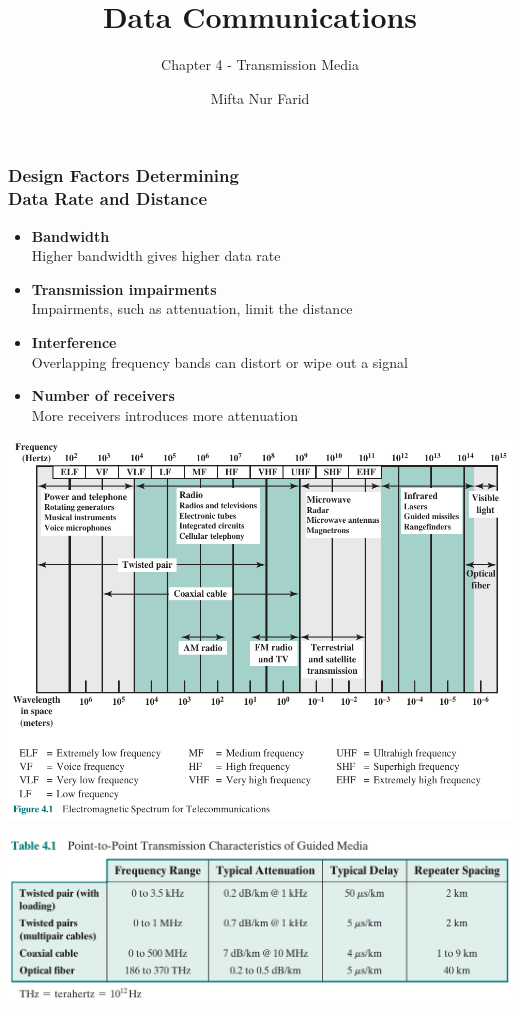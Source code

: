 \documentclass[pdflatex,compress]{beamer}
\title{Data Communications}
\subtitle{Chapter 4 - Transmission Media}
\author{Mifta Nur Farid}
\begin{document}
\maketitle

\begin{frame}
	\frametitle{Design Factors Determining\\Data Rate and Distance}
	\begin{itemize}
		\item \textbf{Bandwidth}\\
		Higher bandwidth gives higher data rate
		\item \textbf{Transmission impairments}\\
		Impairments, such as attenuation, limit the distance
		\item \textbf{Interference}\\
		Overlapping frequency bands can distort or wipe out a signal
		\item \textbf{Number of receivers}\\
		More receivers introduces more attenuation
	\end{itemize}
\end{frame}

\begin{frame}
	\begin{center}
		\includegraphics[width=0.9\linewidth]{img/img01}
	\end{center}
\end{frame}

\begin{frame}
	\begin{center}
		\includegraphics[width=\linewidth]{img/img02}
	\end{center}
\end{frame}
\end{document}

